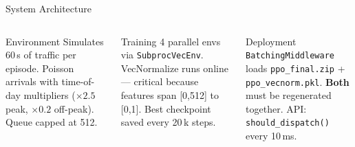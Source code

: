 \documentclass[aspectratio=169]{beamer}
\begin{document}
\begin{frame}{System Architecture}
  \vspace{4pt}
  \begin{columns}[T]
      \begin{block}{\scriptsize Environment}
        \scriptsize Simulates 60\,s of traffic per episode.
        Poisson arrivals with time-of-day multipliers
        ($\times 2.5$ peak, $\times 0.2$ off-peak).
        Queue capped at 512.
      \end{block}
      \begin{block}{\scriptsize Training}
        \scriptsize 4 parallel envs via \texttt{SubprocVecEnv}.
        VecNormalize runs online — critical because features span
        [0,512] to [0,1].
        Best checkpoint saved every 20\,k steps.
      \end{block}
      \begin{block}{\scriptsize Deployment}
        \scriptsize \texttt{BatchingMiddleware} loads
        \texttt{ppo\_final.zip} + \texttt{ppo\_vecnorm.pkl}.
        \textbf{Both} must be regenerated together.
        API: \texttt{should\_dispatch()} every 10\,ms.
      \end{block}
  \end{columns}
\end{frame}
\end{document}
